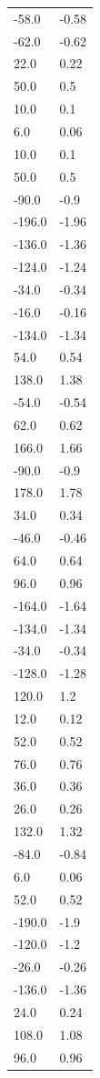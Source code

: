 \begin{longtable}{ll}
-58.0 & -0.58 \\
-62.0 & -0.62 \\
22.0 & 0.22 \\
50.0 & 0.5 \\
10.0 & 0.1 \\
6.0 & 0.06 \\
10.0 & 0.1 \\
50.0 & 0.5 \\
-90.0 & -0.9 \\
-196.0 & -1.96 \\
-136.0 & -1.36 \\
-124.0 & -1.24 \\
-34.0 & -0.34 \\
-16.0 & -0.16 \\
-134.0 & -1.34 \\
54.0 & 0.54 \\
138.0 & 1.38 \\
-54.0 & -0.54 \\
62.0 & 0.62 \\
166.0 & 1.66 \\
-90.0 & -0.9 \\
178.0 & 1.78 \\
34.0 & 0.34 \\
-46.0 & -0.46 \\
64.0 & 0.64 \\
96.0 & 0.96 \\
-164.0 & -1.64 \\
-134.0 & -1.34 \\
-34.0 & -0.34 \\
-128.0 & -1.28 \\
120.0 & 1.2 \\
12.0 & 0.12 \\
52.0 & 0.52 \\
76.0 & 0.76 \\
36.0 & 0.36 \\
26.0 & 0.26 \\
132.0 & 1.32 \\
-84.0 & -0.84 \\
6.0 & 0.06 \\
52.0 & 0.52 \\
-190.0 & -1.9 \\
-120.0 & -1.2 \\
-26.0 & -0.26 \\
-136.0 & -1.36 \\
24.0 & 0.24 \\
108.0 & 1.08 \\
96.0 & 0.96 \\

\end{longtable}
